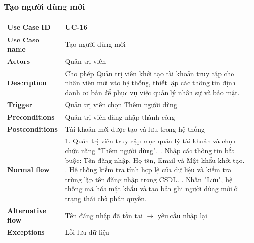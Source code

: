 \subsubsection{Tạo người dùng mới}
\begin{tabular}{|p{3.5cm}|p{9.5cm}|}
\hline
\textbf{Use Case ID} & UC-16 \\
\hline
\textbf{Use Case name} & Tạo  người dùng mới \\
\hline
\textbf{Actors} & Quản trị viên \\
\hline
\textbf{Description} & 
Cho phép Quản trị viên khởi tạo tài khoản truy cập cho nhân viên mới vào hệ thống, thiết lập các thông tin định danh cơ bản để phục vụ việc quản lý nhân sự và bảo mật. \\
\hline
\textbf{Trigger} & Quản trị viên chọn Thêm người dùng \\
\hline
\textbf{Preconditions} & Quản trị viên đăng nhập thành công \\
\hline
\textbf{Postconditions} & Tài khoản mới được tạo và lưu trong hệ thống \\
\hline
\textbf{Normal flow} & 
1. Quản trị viên truy cập mục quản lý tài khoản và chọn chức năng "Thêm người dùng". \newline
2. Nhập các thông tin bắt buộc: Tên đăng nhập, Họ tên, Email và Mật khẩu khởi tạo. \newline
3. Hệ thống kiểm tra tính hợp lệ của dữ liệu và kiểm tra trùng lặp tên đăng nhập trong CSDL. \newline
4. Nhấn "Lưu", hệ thống mã hóa mật khẩu và tạo bản ghi người dùng mới ở trạng thái chờ phân quyền. \\
\hline
\textbf{Alternative flow} & 
Tên đăng nhập đã tồn tại $\rightarrow$ yêu cầu nhập lại \\
\hline
\textbf{Exceptions} & Lỗi lưu dữ liệu \\
\hline
\end{tabular}

